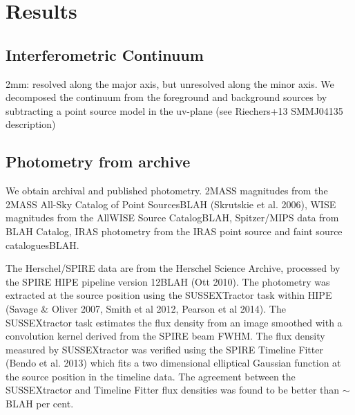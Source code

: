 \documentclass[]{emulateapj}
\begin{document}

\section{Results}
\subsection{\bco}
\subsection{\cco}
\subsection{Interferometric Continuum}
2mm: resolved along the major axis, but unresolved along the minor axis. We decomposed the continuum from the foreground and background sources by subtracting a point
source model in the uv-plane (see Riechers+13 SMMJ04135 description)


\subsection{Photometry from archive}
We obtain archival and published photometry.
2MASS magnitudes from the 2MASS All-Sky
Catalog of Point SourcesBLAH  (Skrutskie et al. 2006), WISE magnitudes
from the AllWISE Source CatalogBLAH, Spitzer/MIPS
data from BLAH Catalog, IRAS photometry from the IRAS point source
and faint source cataloguesBLAH.

The Herschel/SPIRE data are from the Herschel Science Archive, processed
by the SPIRE HIPE pipeline version 12BLAH (Ott 2010). The
photometry was extracted at the source position using the
SUSSEXTractor task within HIPE (Savage \& Oliver 2007,
Smith et al 2012, Pearson et al 2014). The SUSSEXtractor
task estimates the flux density from an image smoothed with
a convolution kernel derived from the SPIRE beam FWHM.
The flux density measured by SUSSEXtractor
was verified using the SPIRE Timeline Fitter (Bendo et
al. 2013) which fits a two dimensional elliptical Gaussian
function at the source position in the timeline data. The
agreement between the SUSSEXtractor and Timeline Fitter
flux densities was found to be better than $\sim$BLAH per cent.
\end{document}
